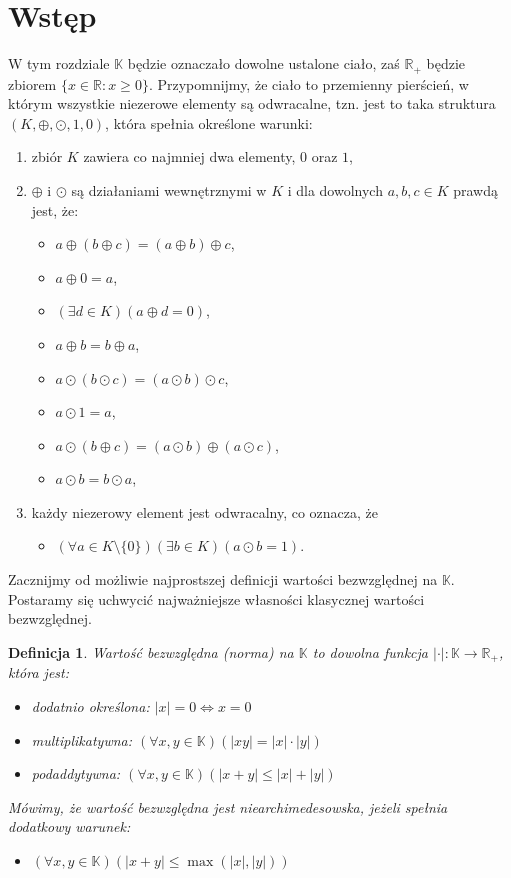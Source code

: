 \documentclass[a4paper,fleqn,9pt]{extarticle}
\newtheorem{dff}{Definicja}
\newenvironment{enumx}{\begin{enumerate}
	\setlength{\itemsep}{0pt}
	\setlength{\parskip}{0pt}
	\setlength{\parsep}{0pt}}
{\end{enumerate}}
\newenvironment{itemx}{\begin{itemize}
	\setlength{\itemsep}{0pt}
	\setlength{\parskip}{0pt}
	\setlength{\parsep}{0pt}}
{\end{itemize}}
\begin{document}
\section{Wstęp}
W tym rozdziale $\mathbb K$ będzie oznaczało dowolne ustalone ciało, zaś $\mathbb R_+$ będzie zbiorem $\{x\in\mathbb R:x\ge 0\}$.
Przypomnijmy, że ciało to przemienny pierścień, w którym wszystkie niezerowe elementy są odwracalne, tzn. jest to taka struktura $(K,\oplus, \odot,1,0)$, która spełnia określone warunki:
\begin{enumx}
\item zbiór $K$ zawiera co najmniej dwa elementy, $0$ oraz $1$,
\item $\oplus$ i $\odot$ są działaniami wewnętrznymi w $K$ i dla dowolnych $a,b,c\in K$ prawdą jest, że:
\begin{itemx}
\item $a \oplus (b \oplus c) = (a \oplus b) \oplus c$,
\item $a \oplus 0 = a$,
\item $(\exists d \in K)(a \oplus d = 0)$,
\item $a \oplus b = b \oplus a$,
\item $a \odot (b \odot c) = (a \odot b) \odot c$,
\item $a \odot 1 = a$,
\item $a \odot (b \oplus c)= (a \odot b) \oplus (a \odot c)$,
\item $a \odot b = b \odot a$,
\end{itemx}
\item każdy niezerowy element jest odwracalny, co oznacza, że
\begin{itemx}
\item $(\forall a \in K \setminus \{0\})(\exists b \in K)(a \odot b = 1)$.
\end{itemx}
\end{enumx}

Zacznijmy od możliwie najprostszej definicji wartości bezwzględnej na $\mathbb K$.
Postaramy się uchwycić najważniejsze własności klasycznej wartości bezwzględnej.

\begin{dff}
Wartość bezwzględna (norma) na $\mathbb K$ to dowolna funkcja $|\cdot| : \mathbb K \rightarrow \mathbb R_+$, która jest:
\begin{itemx}
\item dodatnio określona: $|x| = 0 \iff x = 0$ 
\item multiplikatywna: $(\forall x, y\in\mathbb K)(|xy|=|x|\cdot|y|)$
\item podaddytywna: $(\forall x, y\in\mathbb K)(|x+y|\le|x|+|y|)$
\end{itemx}
Mówimy, że wartość bezwzględna jest niearchimedesowska, jeżeli spełnia dodatkowy warunek:
\begin{itemx}
\item $(\forall x,y\in\mathbb K)(|x+y| \le \max(|x|,|y|))$ 
\end{itemx}
\end{dff}
\end{document}
